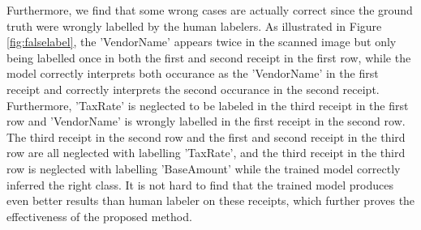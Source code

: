 \documentclass[10pt,twocolumn,letterpaper]{article}
\begin{document}
Furthermore, we find that some wrong cases are actually correct since the ground truth were wrongly labelled by the human labelers. As illustrated in Figure \ref{fig:falselabel}, the 'VendorName' appears twice in the scanned image but only being labelled once in both the first and second receipt in the first row, while the model correctly interprets both occurance as the 'VendorName' in the first receipt and correctly interprets the second occurance in the second receipt. Furthermore, 'TaxRate' is neglected to be labeled in the third receipt in the first row and 'VendorName' is wrongly labelled in the first receipt in the second row. The third receipt in the second row and the first and second receipt in the third row are all neglected with labelling 'TaxRate', and the third receipt in the third row is neglected with labelling 'BaseAmount' while the trained model correctly inferred the right class. It is not hard to find that the trained model produces even better results than human labeler on these receipts, which further proves the effectiveness of the proposed method.
\end{document}
